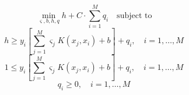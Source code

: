 \documentclass[preview]{standalone}
\begin{document}
\[
\min_{\varsigma,b,h,q}h+C\cdot\sum_{i=1}^Mq_i\quad\text{subject to}\]\[
h\ge y_i\left[\sum_{j=1}^M\varsigma_jK(x_j,x_i)+b\right]+q_i,\quad i=1,\dotsc,M\]
\[
1\le y_i\left[\sum_{j=1}^M\varsigma_jK(x_j,x_i)+b\right]+q_i,\quad i=1,\dotsc,M\]
\[
q_i \ge 0,\quad i=1,\dotsc,M\]
\end{document}
